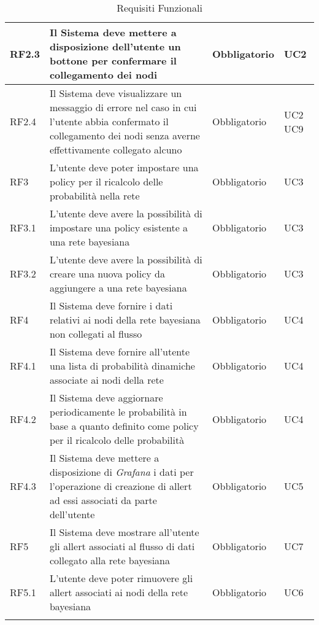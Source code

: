 \begin{center}
\begin{longtable}[c]{|m{}|m{}|m{}|m{}|}
\hline
RF2.3 & Il Sistema deve mettere a disposizione dell'utente un bottone per confermare il collegamento dei nodi & Obbligatorio & UC2\\
\hline
\rowcolor{grigio}RF2.4 & Il Sistema deve visualizzare un messaggio di errore nel caso in cui l'utente abbia confermato il collegamento dei nodi senza averne effettivamente collegato alcuno & Obbligatorio & UC2 UC9\\
\hline
RF3 & L'utente deve poter impostare una policy per il ricalcolo delle probabilità nella rete & Obbligatorio & UC3\\
\hline
\rowcolor{grigio}RF3.1 & L'utente deve avere la possibilità di impostare una policy esistente a una rete bayesiana  & Obbligatorio & UC3\\ 
\hline
RF3.2 & L'utente deve avere la possibilità di creare una nuova policy da aggiungere a una rete bayesiana & Obbligatorio & UC3\\
\hline
\rowcolor{grigio}RF4 & Il Sistema deve fornire i dati relativi ai nodi della rete bayesiana non collegati al flusso & Obbligatorio & UC4\\
\hline
RF4.1 & Il Sistema deve fornire all'utente una lista di probabilità dinamiche associate ai nodi della rete & Obbligatorio & UC4\\
\hline
\rowcolor{grigio}RF4.2 & Il Sistema deve aggiornare periodicamente le probabilità in base a quanto definito come policy per il ricalcolo delle probabilità & Obbligatorio & UC4\\
\hline
RF4.3 & Il Sistema deve mettere a disposizione di \textit{Grafana} i dati per l'operazione di creazione di allert ad essi associati da parte dell'utente & Obbligatorio & UC5\\
\hline
RF5 & Il Sistema deve mostrare all'utente gli allert associati al flusso di dati collegato alla rete bayesiana & Obbligatorio & UC7\\ 
\hline
\rowcolor{grigio}RF5.1 & L'utente deve poter rimuovere gli allert associati ai nodi della rete bayesiana & Obbligatorio & UC6\\ 
\hline
\caption{Requisiti Funzionali}
\end{longtable}
\end{center}


